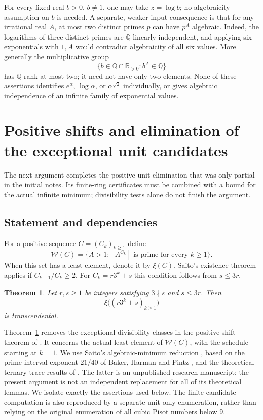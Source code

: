 \documentclass[11pt,a4paper]{article}
\newtheorem{theorem}{Theorem}[section]
\theoremstyle{definition}\newtheorem{definition}[theorem]{Definition}
\theoremstyle{remark}\newtheorem{remark}[theorem]{Remark}
\newcommand{\floor}[1]{\left\lfloor#1\right\rfloor}
\begin{document}
For every fixed real $b>0$, $b\ne1$, one may take $z=\log b$;
no algebraicity assumption on $b$ is needed. A separate, weaker-input
consequence is that for any irrational real $A$, at most two distinct
primes $p$ can have $p^A$ algebraic. Indeed, the logarithms of three
distinct primes are $\mathbb Q$-linearly independent, and applying
six exponentials with $1,A$ would contradict algebraicity of all six
values. More generally the multiplicative group
\[
 \{b\in\overline{\mathbb Q}\cap\mathbb R_{>0}:
                      b^A\in\overline{\mathbb Q}\}
\]
has $\mathbb Q$-rank at most two; it need not have only two elements.
None of these assertions identifies $e^\alpha$, $\log\alpha$, or
$\alpha^{\sqrt2}$ individually, or gives algebraic independence of
an infinite family of exponential values.

\section{Positive shifts and elimination of the exceptional unit candidates}\label{src:P01}
The next argument completes the positive unit elimination that was only partial in the initial notes. Its finite-ring certificates must be combined with a bound for the actual infinite minimum; divisibility tests alone do not finish the argument.
\medskip
\begingroup




\subsection{Statement and dependencies}

For a positive sequence $C=(C_k)_{k\geq1}$ define
\[
 \mathcal W(C)=\{A>1:\floor{A^{C_k}}\text{ is prime for every }k\geq1\}.
\]
When this set has a least element, denote it by $\xi(C)$.
Saito's existence theorem \cite[Theorem 1.3]{Saito} applies if
$C_{k+1}/C_k\geq2$. For $C_k=r3^k+s$ this condition follows from
$s\leq3r$.

\begin{theorem}\label{P01:thm:main}
Let $r,s\geq1$ be integers satisfying $3\nmid s$ and $s\leq3r$.
Then
\[
             \xi\bigl((r3^k+s)_{k\geq1}\bigr)
\]
is transcendental.
\end{theorem}

Theorem~\ref{P01:thm:main} removes the exceptional divisibility classes in the
positive-shift theorem of \cite{K064}. It concerns the actual least element
of $\mathcal W(C)$, with the schedule starting at $k=1$.
We use Saito's algebraic-minimum reduction
\cite[Proposition 3.1]{Saito}, based on the prime-interval exponent
$21/40$ of Baker, Harman and Pintz \cite{BHP}, and the theoretical
ternary trace results of \cite{K064}. The latter is an unpublished
research manuscript; the present argument is not an independent replacement
for all of its theoretical lemmas. We isolate exactly the assertions used
below. The finite candidate computation is also reproduced by a separate
unit-only enumeration, rather than relying on the original enumeration of
all cubic Pisot numbers below $9$.
\end{document}
